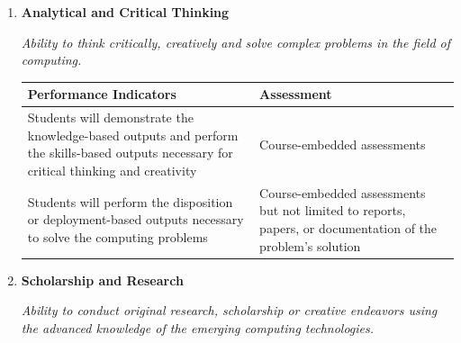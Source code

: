 \documentclass[11pt,a4paper]{article}
\begin{document}

\begin{enumerate}
\item {\bf Analytical and Critical Thinking}
 
\textit{Ability to think critically, creatively and solve complex problems in the field of computing.}

\begin{tabular}{L{3.5in}L{2in}}
\hline
{\bf Performance Indicators} & {\bf Assessment} \\
\hline
Students will demonstrate the knowledge-based outputs and perform the skills-based outputs necessary for critical thinking and creativity & Course-embedded assessments\\
Students will perform the disposition or deployment-based outputs necessary to solve the computing problems & Course-embedded assessments but not limited to reports, papers, or documentation of the problem's solution \\
\hline
\end{tabular}

\item {\bf Scholarship and Research}

\textit{Ability to conduct original research, scholarship or creative endeavors using the advanced knowledge of the emerging computing technologies.}


\end{enumerate}
\end{document}
